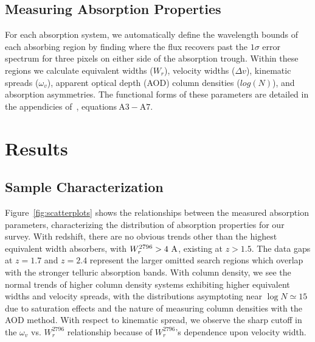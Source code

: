 \documentclass[iop,apj,numberedappendix,appendixfloats,twocolappendix]{emulateapj}
\begin{document}

\subsection{Measuring Absorption Properties}
\label{sec:measuring}

For each absorption system, we automatically define the wavelength bounds of each absorbing region by finding where the flux recovers past the $1\sigma$ error spectrum for three pixels on either side of the absorption trough. Within these regions we calculate equivalent widths ($W_r$), velocity widths ($\Delta v$), kinematic spreads ($\omega_v$), apparent optical depth (AOD) column densities ($log(N)$), and absorption asymmetries. The functional forms of these parameters are detailed in the appendicies of~\cite{Churchill2001}, equations$~\mathrm{A3 - A7}$.



\section{Results}
\label{sec:results}

\subsection{Sample Characterization}
\label{sec:sample}

\begin{figure*}[bth]
\caption{Correlations between measured absorption properties for survey sample. $\log N$ is the AOD column density, $\omega_v$ is the kinematic spread, $W_r^{2796}$ is the rest frame {} equivalent width, and $z$ is the absorption redshift.}
\label{fig:scatterplots}
\end{figure*}

Figure~\ref{fig:scatterplots} shows the relationships between the measured absorption parameters, characterizing the distribution of absorption properties for our survey. With redshift, there are no obvious trends other than the highest equivalent width absorbers, with $W_r^{2796} > 4~\mathrm{\AA}$, existing at $z > 1.5$. The data gaps at $z = 1.7$ and $z = 2.4$ represent the larger omitted search regions which overlap with the stronger telluric absorption bands. With column density, we see the normal trends of higher column density systems exhibiting higher equivalent widths and velocity spreads, with the distributions asymptoting near $\log N \simeq 15$ due to saturation effects and the nature of measuring column densities with the AOD method. With respect to kinematic spread, we observe the sharp cutoff in the $\omega_v$ vs. $W_r^{2796}$ relationship because of $W_r^{2796}$'s dependence upon velocity width. 
\end{document}
